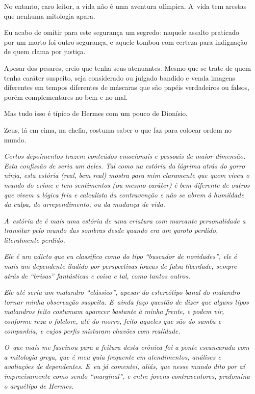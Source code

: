 \asterisc{}

No entanto, caro leitor, a vida não é uma aventura olímpica. A~vida tem
arestas que nenhuma mitologia apara.

Eu acabo de omitir para este segurança um segredo: naquele assalto
praticado por  um morto foi outro segurança, e aquele tombou com
certeza para indignação de quem clama por justiça.

Apesar dos pesares, creio que  tenha seus atenuantes. Mesmo que se
trate de quem tenha caráter suspeito, seja considerado ou julgado
bandido e venda imagens diferentes em tempos diferentes de máscaras que
são papéis verdadeiros ou falsos, porém complementares no bem e no mal.

Mas tudo isso é típico de Hermes com um pouco de Dionísio.

Zeus, lá em cima, na chefia, costuma saber o que faz para colocar ordem
no mundo.

\begin{center}\asterisc{}\end{center}


\emph{Certos depoimentos trazem conteúdos emocionais e pessoais de maior
dimensão. Esta confissão de  seria um deles. Tal como na estória da
lágrima atrás do gorro ninja, esta estória (real, bem real) mostra para
mim claramente que quem viveu o mundo do crime e tem sentimentos (ou
mesmo caráter) é bem diferente de outros que vivem a lógica fria e
calculista da contravenção e não se abrem à humildade da culpa, do
arrependimento, ou da mudança de vida.}~

\emph{A~estória de  é mais uma estória de uma criatura com marcante
personalidade a transitar pelo mundo das sombras desde quando era um
garoto perdido, literalmente perdido.}~

\emph{Ele é um adicto que eu classifico como do tipo ``buscador de
novidades'', ele é mais um dependente iludido por perspectivas loucas de
falsa liberdade, sempre atrás de ``brisas'' fantásticas e coisa e tal,
como tantos outros.}~

\emph{Ele até seria um malandro ``clássico'', apesar do estereótipo
banal do malandro tornar minha observação suspeita. E~ainda faço questão
de dizer que alguns tipos malandros feito  costumam aparecer bastante
à minha frente, e podem vir, conforme reza o folclore, até do morro,
feito aqueles que são do samba e companhia, e cujos perfis misturam
chavões com realidade.}~

\emph{O~que mais me fascinou para a feitura desta crônica foi a ponte
escancarada com a mitologia grega, que é meu guia frequente em
atendimentos, análises e avaliações de dependentes. E~eu já comentei,
aliás, que nesse mundo dito por aí imprecisamente como sendo
``marginal'', e entre jovens contraventores, predomina o arquétipo de
Hermes.}~

